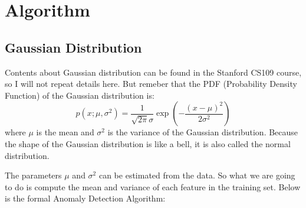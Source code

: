 \section{Algorithm}
\subsection*{Gaussian Distribution}
Contents about Gaussian distribution can be found in the Stanford CS109 course, so I will not repeat details here.
But remeber that the PDF (Probability Density Function) of the Gaussian distribution is:
\begin{equation}
    p(x;\mu,\sigma^2) = \frac{1}{\sqrt{2\pi}\sigma} \exp\left(-\dfrac{(x-\mu)^2}{2\sigma^2}\right)
\end{equation}
where $\mu$ is the mean and $\sigma^2$ is the variance of the Gaussian distribution.
Because the shape of the Gaussian distribution is like a bell, it is also called the normal distribution.\par
The parameters $\mu$ and $\sigma^2$ can be estimated from the data.
So what we are going to do is compute the mean and variance of each feature in the training set.
Below is the formal Anomaly Detection Algorithm:
